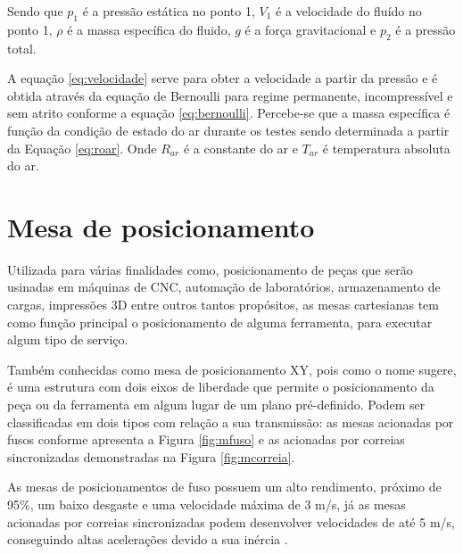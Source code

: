 Sendo que $p_{1}$ é a pressão estática no ponto 1, $V_{1}$ é a velocidade do fluído no ponto 1, $\rho$ 
é a massa específica do fluido, $g$ é a força gravitacional e $p_{2}$ é a pressão total.

A equação \ref{eq:velocidade} serve para obter a velocidade a partir da pressão e é obtida 
através da equação de Bernoulli para regime permanente, incompressível e sem atrito 
conforme a equação \ref{eq:bernoulli}. Percebe-se que a massa específica é função da condição 
de estado do ar durante os testes sendo determinada a partir da Equação \ref{eq:roar}. 
Onde $R_{ar}$ é a constante do ar e $T_{ar}$ é temperatura absoluta do ar.

\section{Mesa de posicionamento}\label{sec:mesa}

Utilizada para várias finalidades como, posicionamento de peças que serão usinadas em máquinas de 
\ac{CNC}, automação de laboratórios, armazenamento de cargas, impressões 3D entre 
outros tantos propósitos, as mesas cartesianas tem como função principal o posicionamento de alguma 
ferramenta, para executar algum tipo de serviço.

Também conhecidas como mesa de posicionamento XY, pois como o nome sugere, é uma estrutura com dois eixos 
de liberdade que permite o posicionamento da peça ou da ferramenta em algum lugar de um plano pré-definido. 
Podem ser classificadas em dois tipos com relação a sua transmissão: as mesas acionadas por fusos conforme 
apresenta a Figura \ref{fig:mfuso} e as acionadas por correias sincronizadas demonstradas na Figura \ref{fig:mcorreia}.

As mesas de posicionamentos de fuso possuem um alto rendimento, próximo de 95\%, um baixo desgaste e uma 
velocidade máxima de 3 m/s, já as mesas acionadas por correias sincronizadas podem desenvolver velocidades 
de até 5 m/s, conseguindo altas acelerações devido a sua inércia \cite{rocha2015retrofitting}.

